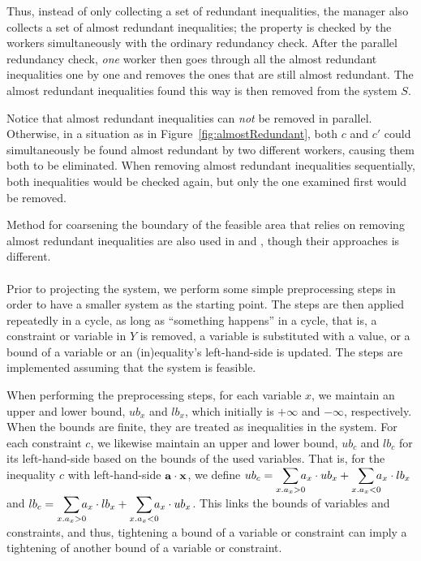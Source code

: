 Thus, instead of only collecting a set of redundant inequalities, the manager also collects a set of almost redundant inequalities; the property is checked by the workers simultaneously with the ordinary redundancy check. After the parallel redundancy check, \emph{one} worker then goes through all the almost redundant inequalities one by one and removes the ones that are still almost redundant. The almost redundant inequalities found this way is then removed from the system $S$.  

Notice that almost redundant inequalities can \emph{not} be removed in parallel. Otherwise, in a situation as in Figure~\ref{fig:almostRedundant}, both $c$ and $c'$ could simultaneously be found almost redundant by two different workers, causing them both to be eliminated. When removing almost redundant inequalities sequentially, both inequalities would be checked again, but only the one examined first would be removed.

Method for coarsening the boundary of the feasible area that relies on removing almost redundant inequalities are also used in \cite{lukatskii08} and \cite{shapot12}, though their approaches is different.
\\\\
Prior to projecting the system, we perform some simple preprocessing steps in order to have a smaller system as the starting point. The steps are then applied repeatedly in a cycle, as long as ``something happens'' in a cycle, that is, a constraint or variable in $Y$ is removed, a variable is substituted with a value, or a bound of a variable or an (in)equality's left-hand-side is updated. The steps are implemented assuming that the system is feasible.

When performing the preprocessing steps, for each variable $x$, we maintain an upper and lower bound, $ub_x$ and $lb_x$, which initially is $+\infty$ and $-\infty$, respectively. When the bounds are finite, they are treated as inequalities in the system. For each constraint $c$, we likewise maintain an upper and lower bound, $ub_c$ and $lb_c$ for its left-hand-side {based on the bounds of the used variables}. That is, for the inequality $c$ with left-hand-side $\mathbf{a}\cdot\mathbf{x}$, we define $ub_c = \smashoperator[r]{\sum_{x. a_x>0}}a_x\cdot ub_x + \smashoperator[r]{\sum_{x.a_x<0}}a_x\cdot lb_x$ and $lb_c = \smashoperator[r]{\sum_{x. a_x>0}}a_x\cdot lb_x + \smashoperator[r]{\sum_{x.a_x<0}}a_x\cdot ub_x$. 
This links the bounds of variables and constraints, and thus, %
tightening a bound of a variable or constraint can imply a tightening of another bound of a variable or constraint. 

